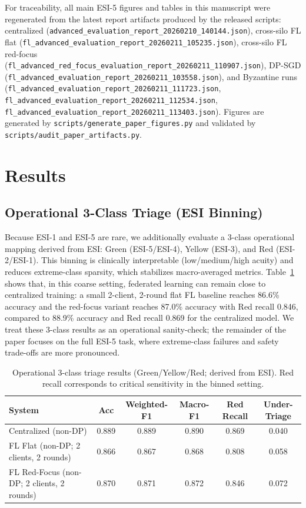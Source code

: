 \documentclass[journal,article,submit,pdftex,moreauthors]{Definitions/mdpi}
\begin{document}
For traceability, all main ESI-5 figures and tables in this manuscript were regenerated from the latest report artifacts produced by the released scripts: centralized (\texttt{advanced\_evaluation\_report\_20260210\_140144.json}), cross-silo FL flat (\texttt{fl\_advanced\_evaluation\_report\_20260211\_105235.json}), cross-silo FL red-focus (\texttt{fl\_advanced\_red\_focus\_evaluation\_report\_20260211\_110907.json}), DP-SGD (\texttt{fl\_advanced\_evaluation\_report\_20260211\_103558.json}), and Byzantine runs (\texttt{fl\_advanced\_evaluation\_report\_20260211\_111723.json}, \texttt{fl\_advanced\_evaluation\_report\_20260211\_112534.json}, \texttt{fl\_advanced\_evaluation\_report\_20260211\_113403.json}). Figures are generated by \texttt{scripts/generate\_paper\_figures.py} and validated by \texttt{scripts/audit\_paper\_artifacts.py}.

\section{Results}\label{sec:results}

\subsection{Operational 3-Class Triage (ESI Binning)}

Because ESI-1 and ESI-5 are rare, we additionally evaluate a 3-class operational mapping derived from ESI: Green (ESI-5/ESI-4), Yellow (ESI-3), and Red (ESI-2/ESI-1). This binning is clinically interpretable (low/medium/high acuity) and reduces extreme-class sparsity, which stabilizes macro-averaged metrics. Table~\ref{tab:3class} shows that, in this coarse setting, federated learning can remain close to centralized training: a small 2-client, 2-round flat FL baseline reaches 86.6\% accuracy and the red-focus variant reaches 87.0\% accuracy with Red recall 0.846, compared to 88.9\% accuracy and Red recall 0.869 for the centralized model. We treat these 3-class results as an operational sanity-check; the remainder of the paper focuses on the full ESI-5 task, where extreme-class failures and safety trade-offs are more pronounced.

\begin{table}[H]
\centering
\caption{Operational 3-class triage results (Green/Yellow/Red; derived from ESI). Red recall corresponds to critical sensitivity in the binned setting.}
\label{tab:3class}
\small
\begin{tabular}{lccccc}
\toprule
System & Acc & Weighted-F1 & Macro-F1 & Red Recall & Under-Triage \\
\midrule
Centralized (non-DP) & 0.889 & 0.889 & 0.890 & 0.869 & 0.040 \\
FL Flat (non-DP; 2 clients, 2 rounds) & 0.866 & 0.867 & 0.868 & 0.808 & 0.058 \\
FL Red-Focus (non-DP; 2 clients, 2 rounds) & 0.870 & 0.871 & 0.872 & 0.846 & 0.072 \\
\bottomrule
\end{tabular}
\end{table}
\end{document}
